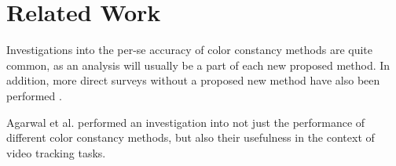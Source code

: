 \section{Related Work}

Investigations into the per-se accuracy of color constancy methods are quite common, as an analysis will usually be a part of each new proposed method.
In addition, more direct surveys without a proposed new method have also been performed \cite{barnard2002comparison1} \cite{barnard2002comparison2}.

Agarwal et al. \cite{Agarwal2006} performed an investigation into not just the performance of different color constancy methods, but also their usefulness
in the context of video tracking tasks.